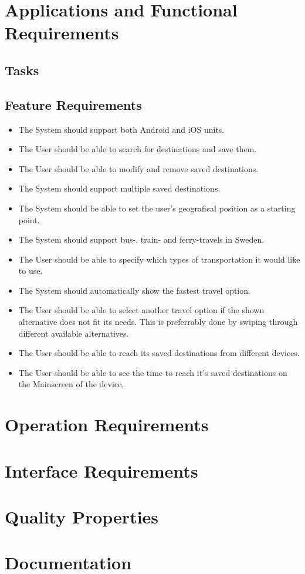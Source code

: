 \documentclass[a4paper]{article}
\begin{document}
	\section{Applications and Functional Requirements}
	\subsection{Tasks}
			
	\subsection{Feature Requirements}
	\begin{itemize}
			\item The System should support both Android and iOS units.
			\item The User should be able to search for destinations and save them.
			\item The User should be able to modify and remove saved destinations.
			\item The System should support multiple saved destinations.
			\item The System should be able to set the user's geografical position as a starting point.
			\item The System should support bus-, train- and ferry-travels in Sweden.
			\item The User should be able to specify which types of transportation it would like to use. 
			\item The System should automatically show the fastest travel option.
			\item The User should be able to select another travel option if the shown alternative does not fit its needs. This 				is preferrably done by swiping through different available alternatives.
			\item The User should be able to reach its saved destinations from different devices.
			\item The User should be able to see the time to reach it's saved destinations on the Mainscreen of the device.
		\end{itemize}
	\section{Operation Requirements}
	\section{Interface Requirements}
	\section{Quality Properties}
	\section{Documentation}
	
\end{document}

